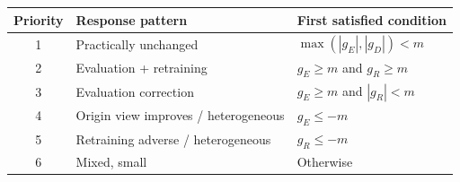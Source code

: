 \begin{tabular}{@{}cll@{}}
\toprule
Priority & Response pattern & First satisfied condition \\
\midrule
1 & Practically unchanged & $\max(|g_E|,|g_D|)<m$ \\
2 & Evaluation + retraining & $g_E\geq m$ and $g_R\geq m$ \\
3 & Evaluation correction & $g_E\geq m$ and $|g_R|<m$ \\
4 & Origin view improves / heterogeneous & $g_E\leq-m$ \\
5 & Retraining adverse / heterogeneous & $g_R\leq-m$ \\
6 & Mixed, small & Otherwise \\
\bottomrule
\end{tabular}
